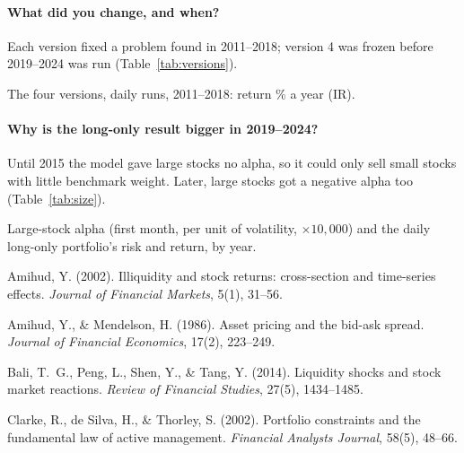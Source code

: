\documentclass[11pt]{article}
\begin{document}
\paragraph{What did you change, and when?} Each version fixed a problem found in 2011--2018; version 4 was frozen before
2019--2024 was run (Table~\ref{tab:versions}).
\begin{table}[H]
\centering
\caption{The four versions, daily runs, 2011--2018: return \% a year (IR).}\label{tab:versions}

\end{table}

\paragraph{Why is the long-only result bigger in 2019--2024?} Until 2015 the model gave large stocks no alpha, so it could
only sell small stocks with little benchmark weight. Later, large stocks got a negative alpha too (Table~\ref{tab:size}).
\begin{table}[H]
\centering
\caption{Large-stock alpha (first month, per unit of volatility, $\times10{,}000$) and the daily long-only portfolio's
risk and return, by year.}\label{tab:size}
\begin{minipage}{0.5\linewidth}\centering\end{minipage}
\end{table}

\begin{thebibliography}{9}
Amihud, Y. (2002). Illiquidity and stock returns: cross-section and time-series effects.
\emph{Journal of Financial Markets}, 5(1), 31--56.

Amihud, Y., \& Mendelson, H. (1986). Asset pricing and the bid-ask spread. \emph{Journal of Financial Economics}, 17(2), 223--249.

Bali, T.~G., Peng, L., Shen, Y., \& Tang, Y. (2014). Liquidity shocks and stock market reactions.
\emph{Review of Financial Studies}, 27(5), 1434--1485.

Clarke, R., de Silva, H., \& Thorley, S. (2002). Portfolio constraints and the fundamental law of
active management. \emph{Financial Analysts Journal}, 58(5), 48--66.

\end{thebibliography}
\end{document}
